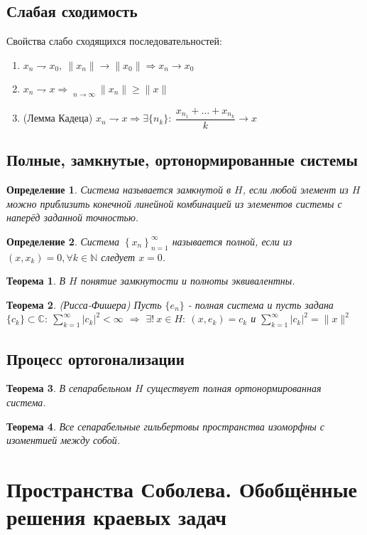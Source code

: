 \documentclass[9pt, a4paper]{extarticle}
\newtheorem{theorem}{Теорема}
\newtheorem{definition}{Определение}
\DeclareMathOperator*\lowlim{\underline{lim}}
\numberwithin{equation}{section}
\numberwithin{lemma}{section}
\numberwithin{definition}{section}
\numberwithin{notabene}{section}
\numberwithin{corollary}{section}
\begin{document}
	\subsection{Слабая сходимость}
		Свойства слабо сходящихся последовательностей:
		\begin{enumerate}
			\item $x_n \rightharpoondown x_0 , \ \|x_n\| \to \|x_0\| \Rightarrow x_n \to x_0$
			\item $x_n \rightharpoondown x \Rightarrow  \lowlim\limits_{n\to\infty} \|x_n\| \geq \|x\|$
			\item (Лемма Кадеца) $x_n \rightharpoondown x \Rightarrow \exists \{n_k\}: \ \dfrac{x_{n_1} + \dots + x_{n_k}}{k} \to x$
		\end{enumerate}
	\subsection{Полные, замкнутые, ортонормированные системы}
		\begin{definition}
			Система называется замкнутой в $H$, если любой элемент из $H$ можно приблизить конечной линейной комбинацией из элементов системы с наперёд заданной точностью.
		\end{definition}
		\begin{definition}
			Система $\left\{x_n\right\}_{n=1}^{\infty}$ называется полной, если из $(x,x_k) = 0, \forall k \in \mathbb{N}$ следует $x = 0$. 
		\end{definition}
		\begin{theorem}
			В $H$ понятие замкнутости и полноты эквивалентны.		
		\end{theorem}
		\begin{theorem}
				(Рисса-Фишера)\newline
				Пусть $\{e_n\}$ - полная система и пусть задана $\{c_k\} \subset \mathbb{C}: \ \sum\limits_{k=1}^{\infty} |c_k|^2 < \infty$ $\Rightarrow$  $\exists! \ x\in H : \ (x,e_k) = c_k$ и $\sum\limits_{k=1}^{\infty} |c_k|^2 = \|x\|^2$
		\end{theorem}
		\subsection{Процесс ортогонализации}
		\begin{theorem}
			В сепарабельном $H$ существует полная ортонормированная система.			
		\end{theorem}
		\begin{theorem}
			Все сепарабельные гильбертовы пространства изоморфны с изоментией между собой. 
		\end{theorem}
		\section{Пространства Соболева. Обобщённые решения краевых задач}
		
\end{document}
